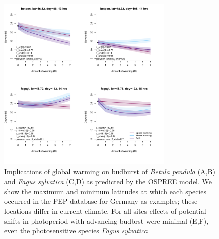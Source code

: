\documentclass{article}
\begin{document}
\newpage

\begin{figure}[h!]
\centering
\noindent \includegraphics[width=0.75\textwidth]{..//..//analyses/bb_analysis/figures/tempforecast_betpenfagsyl_minmaxlat_PEPBB.pdf}
\caption{Implications of global warming on budburst of \emph{Betula pendula} (A,B) and \emph{Fagus sylvatica} (C,D) as predicted by the OSPREE model. We show the maximum and minimum latitudes at which each species occurred in the PEP database for Germany as examples; these locations differ in current climate. For all sites effects of potential shifts in photoperiod with advancing budbrst were minimal (E,F), even the photosensitive species \emph{Fagus sylvatica}}%

\label{fig:fore}
\end{figure}
\end{document}
